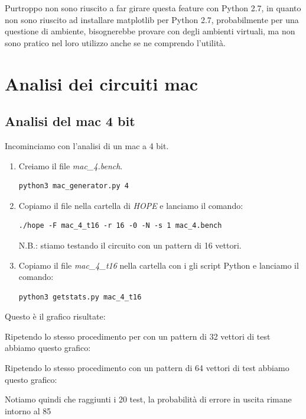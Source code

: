 \documentclass[12pt, letterpaper]{article}
\begin{document}
Purtroppo non sono riuscito a far girare questa feature con Python 2.7, in quanto non sono riuscito ad installare matplotlib per Python 2.7, probabilmente per una questione di ambiente, bisognerebbe provare con degli ambienti virtuali, ma non sono pratico nel loro utilizzo anche se ne comprendo l'utilità.

\section{Analisi dei circuiti mac}

\subsection{Analisi del mac 4 bit}

Incominciamo con l'analisi di un mac a 4 bit. 

\begin{enumerate}
\item Creiamo il file \textit{mac\_4.bench}.
\begin{lstlisting}
python3 mac_generator.py 4
\end{lstlisting}
\item Copiamo il file nella cartella di \textit{HOPE} e lanciamo il comando:
\begin{lstlisting}
./hope -F mac_4_t16 -r 16 -0 -N -s 1 mac_4.bench
\end{lstlisting}
N.B.: stiamo testando il circuito con un pattern di 16 vettori.
\item Copiamo il file \textit{mac\_4\_t16} nella cartella con i gli script Python e lanciamo il comando:
\begin{lstlisting}
python3 getstats.py mac_4_t16
\end{lstlisting}
\end{enumerate}

Questo è il grafico risultate:



Ripetendo lo stesso procedimento per con un pattern di 32 vettori di test abbiamo questo grafico:



Ripetendo lo stesso procedimento con un pattern di 64 vettori di test abbiamo questo grafico:



Notiamo quindi che raggiunti i 20 test, la probabilità di errore in uscita rimane intorno al 85%
\end{document}
